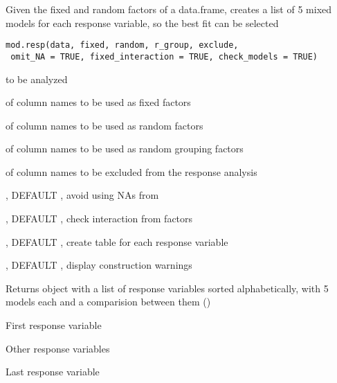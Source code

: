 \documentclass[letterpaper]{book}
\begin{document}
%
\begin{Description}\relax
Given the fixed and random factors of a data.frame, creates a list of 5 mixed models for each response variable,
so the best fit can be selected
\end{Description}
%
\begin{Usage}
\begin{verbatim}
mod.resp(data, fixed, random, r_group, exclude,
 omit_NA = TRUE, fixed_interaction = TRUE, check_models = TRUE)
\end{verbatim}
\end{Usage}
%
\begin{Arguments}
\begin{ldescription}
\item[\code{data}] 
 to be analyzed

\item[\code{fixed}] 
 of column names to be used as fixed factors

\item[\code{random}] 
 of column names to be used as random factors

\item[\code{r\_group}] 
 of column names to be used as random grouping factors

\item[\code{exclude}] 
 of column names to be excluded from the response analysis

\item[\code{omit\_NA}] 
, DEFAULT , avoid using NAs from 

\item[\code{fixed\_interaction}] 
, DEFAULT , check interaction from  factors

\item[\code{check\_models}] 
, DEFAULT , create  table for each response variable

\item[\code{lmer\_warnings}] 
, DEFAULT , display  construction warnings

\end{ldescription}
\end{Arguments}
%
\begin{Value}
Returns  object with a list of response variables sorted alphabetically,
with 5 models each and a comparision between them ()

\begin{ldescription}
\item[\code{resp\_1}] First response variable
\item[\code{resp\_...}] Other response variables
\item[\code{resp\_n}] Last response variable
\end{ldescription}

\end{Value}
\end{document}
